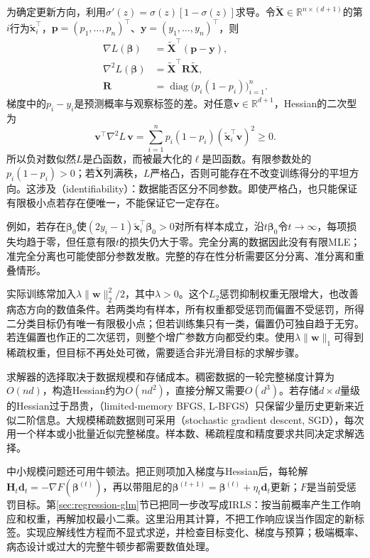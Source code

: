 为确定更新方向，利用$\sigma'(z)=\sigma(z)[1-\sigma(z)]$求导。令$\tilde{\bm{X}}\in\mathbb{R}^{n\times(d+1)}$的第$i$行为$\tilde{\bm{x}}_i^{\top}$，$\bm{p}=(p_1,\ldots,p_n)^{\top}$、$\bm{y}=(y_1,\ldots,y_n)^{\top}$，则
\begin{equation}
  \label{eq:classification-logistic-derivatives}
  \begin{aligned}
    \nabla L(\bm{\beta})
      &=\tilde{\bm{X}}^{\top}(\bm{p}-\bm{y}),\\
    \nabla^2 L(\bm{\beta})
      &=\tilde{\bm{X}}^{\top}\bm{R}\tilde{\bm{X}},\\
    \bm{R}
      &=\operatorname{diag}\bigl(p_i(1-p_i)\bigr)_{i=1}^{n}.
  \end{aligned}
\end{equation}
梯度中的$p_i-y_i$是预测概率与观察标签的差。对任意$\bm{v}\in\mathbb{R}^{d+1}$，Hessian的二次型为
\[
  \bm{v}^{\top}\nabla^2L\,\bm{v}
  =\sum_{i=1}^{n}p_i(1-p_i)
    (\tilde{\bm{x}}_i^{\top}\bm{v})^2\geq0.
\]
所以负对数似然$L$是凸函数，而被最大化的$\ell$是凹函数。有限参数处的$p_i(1-p_i)>0$；若$\tilde{\bm{X}}$列满秩，$L$严格凸，否则可能存在不改变训练得分的平坦方向。这涉及（identifiability）：数据能否区分不同参数。即使严格凸，也只能保证有限极小点若存在便唯一，不能保证它一定存在。

例如，若存在$\bm{\beta}_0$使$(2y_i-1)\tilde{\bm{x}}_i^{\top}\bm{\beta}_0>0$对所有样本成立，沿$t\bm{\beta}_0$令$t\to\infty$，每项损失均趋于零，但任意有限$t$的损失仍大于零。完全分离的数据因此没有有限MLE；准完全分离也可能使部分参数发散。完整的存在性分析需要区分分离、准分离和重叠情形。

实际训练常加入$\lambda\lVert\bm{w}\rVert_2^2/2$，其中$\lambda>0$。这个$L_2$惩罚抑制权重无限增大，也改善病态方向的数值条件。若两类均有样本，所有权重都受惩罚而偏置不受惩罚，所得二分类目标仍有唯一有限极小点；但若训练集只有一类，偏置仍可独自趋于无穷。若连偏置也作正的二次惩罚，则整个增广参数方向都受约束。使用$\lambda\lVert\bm{w}\rVert_1$可得到稀疏权重，但目标不再处处可微，需要适合非光滑目标的求解步骤。

求解器的选择取决于数据规模和存储成本。稠密数据的一轮完整梯度计算为$O(nd)$，构造Hessian约为$O(nd^2)$，直接分解又需要$O(d^3)$。若存储$d\times d$量级的Hessian过于昂贵，（limited-memory BFGS, L-BFGS）只保留少量历史更新来近似二阶信息。大规模稀疏数据则可采用（stochastic gradient descent, SGD），每次用一个样本或小批量近似完整梯度。样本数、稀疏程度和精度要求共同决定求解选择。

中小规模问题还可用牛顿法。把正则项加入梯度与Hessian后，每轮解$\bm H_t\bm d_t=-\nabla F(\bm\beta^{(t)})$，再以带阻尼的$\bm\beta^{(t+1)}=\bm\beta^{(t)}+\eta_t\bm d_t$更新；$F$是当前受惩罚目标。第\ref{sec:regression-glm}节已把同一步改写成IRLS：按当前概率产生工作响应和权重，再解加权最小二乘。这里沿用其计算，不把工作响应误当作固定的新标签。实现应解线性方程而不显式求逆，并检查目标变化、梯度与预算；极端概率、病态设计或过大的完整牛顿步都需要数值处理。


